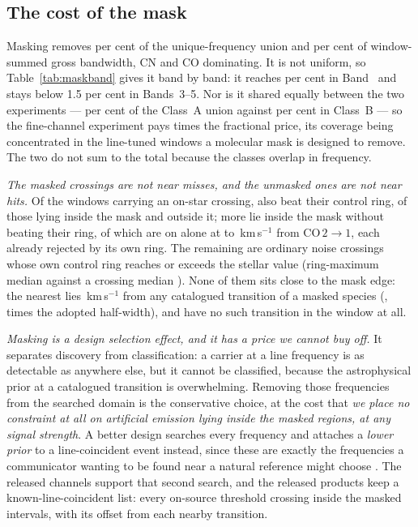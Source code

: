 \subsection{The cost of the mask}
\label{sec:linecost}

Masking removes \MaskUnionPct{} per cent of the
unique-frequency union and \MaskGrossPct{} per cent of window-summed gross
bandwidth, CN and CO dominating. It is not uniform, so
Table~\ref{tab:maskband} gives it band by band: it reaches \MaskWorstPct{}
per cent in Band~\MaskWorstBand{} and stays below 1.5 per cent in
Bands~3--5. Nor is it shared equally between the two experiments ---
\MaskPctA{} per cent of the Class~A union against \MaskPctB{} per cent in
Class~B --- so the fine-channel experiment pays \MaskPctRatioAB{} times the
fractional price, its coverage being concentrated in the line-tuned windows a
molecular mask is designed to remove. The two do not sum to the total because
the classes overlap in frequency.

\emph{The masked crossings are not near misses, and the unmasked ones are
not near hits.} Of the \NCross{} windows carrying an on-star crossing,
\NSpatial{} also beat their control ring, \MaskCrossInStageOne{} of those
lying inside the mask and \MaskCrossOutStageOne{} outside it;
\MaskCrossInNoFlag{} more lie inside the mask without beating their ring, of
which \MaskRepN{} are on \MaskRepStar{} alone at \MaskRepVLo{} to
\MaskRepVHi\,km\,s$^{-1}$ from CO\,$2{\to}1$, each already rejected by its
own ring. The remaining \NonExcRingGe{} are ordinary noise crossings whose
own control ring reaches or exceeds the stellar value (ring-maximum median
\NonExcRingMed{} against a crossing median \NonExcHitMed). None of them sits
close to the mask edge: the nearest lies \MaskNearestKms\,km\,s$^{-1}$ from
any catalogued transition of a masked species (\MaskNearestStar,
\MaskNearestMult{} times the adopted half-width), and \MaskNoLineN{} have no
such transition in the window at all.

\emph{Masking is a design selection effect, and it has a price we cannot
buy off.} It separates discovery from classification: a carrier at a line
frequency is as detectable as anywhere else, but it cannot be classified,
because the astrophysical prior at a catalogued transition is overwhelming.
Removing those frequencies from the searched domain is the conservative
choice, at the cost that \emph{we place no constraint at all on artificial
emission lying inside the masked regions, at any signal strength}. A better
design searches every frequency and attaches a \emph{lower prior} to a
line-coincident event instead, since these are exactly the frequencies a
communicator wanting to be found near a natural reference might choose
\citep{CocconiMorrison1959}. The released channels support that second
search, and the released products keep a known-line-coincident list: every
on-source threshold crossing inside the masked intervals, with its offset
from each nearby transition.
